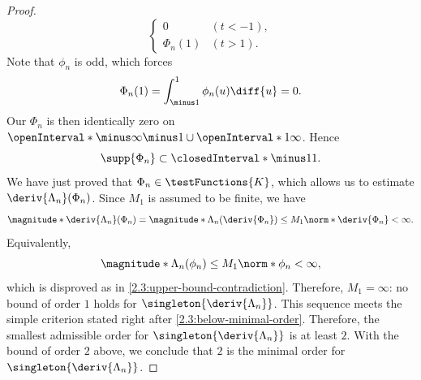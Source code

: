 \begin{proof}
\begin{equation}
\begin{cases}
    0 & (t < \minus 1),  \\
    \Phi_n(1) & (t > 1).
  \end{cases}
\end{equation}
% 
Note that $\phi_n$ is odd, which forces 
% 
\begin{equation}
  \Phi_n(1) = \int_{\minus 1}^{1} \phi_n(u) \diff{u} = 0.
\end{equation}
% 
Our $\Phi_n$ is then identically zero on $\openInterval*{\minus \infty}{\minus 1} \cup \openInterval*{1}{\infty}$. Hence
% 
\begin{equation}
  \supp{\Phi_n} \subset \closedInterval*{\minus 1}{1}. %
\end{equation}
%
We have just proved that $\Phi_n \in \testFunctions{K}$, which allows us to estimate $\deriv{\Lambda_n}(\Phi_n)$. Since $M_1$ %
is assumed to be finite, we have
% 
\begin{equation}
  \magnitude*{\deriv{\Lambda_n}(\Phi_n)} = \magnitude*{\Lambda_n(\deriv{\Phi_n})} \leq M_1 \norm*{\deriv{\Phi_n}} < \infty. 
\end{equation}
% 
Equivalently,
% 
\begin{equation}
  \magnitude*{\Lambda_n(\phi_n)} \leq M_1 \norm*{\phi_n} < \infty, 
\end{equation}
% 
which is disproved as in \eqref{2.3:upper-bound-contradiction}. Therefore, $M_1 = \infty$: no bound of order $1$ %
holds for $\singleton{\deriv{\Lambda_n}}$. This sequence meets the simple criterion stated right after %
\eqref{2.3:below-minimal-order}. Therefore, the smallest admissible order for $\singleton{\deriv{\Lambda_n}}$ is at least $2$. 
With the bound of order $2$ above, we conclude that $2$ is the minimal order for $\singleton{\deriv{\Lambda_n}}$.
% 
\end{proof} 
% 
